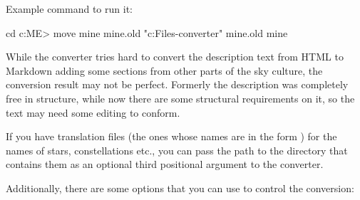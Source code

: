  
Example command to run it:

\begin{commands}[\footnotesize]
cd c:\Users\<ME>\AppData\Roaming\skycultures
move mine mine.old
"c:\Program Files\stellarium\skyculture-converter" mine.old mine
\end{commands}

While the converter tries hard to convert the description text from HTML to Markdown adding some sections from other parts of the sky culture, the conversion result may not be perfect. 
Formerly the description was completely free in structure, while now there are some structural requirements on it, so the text may need some editing to conform.

If you have  translation files (the ones whose names are in the form ) for the names of stars, constellations etc., 
you can pass the path to the directory that contains them as an optional third positional argument to the converter.

Additionally, there are some options that you can use to control the conversion:

